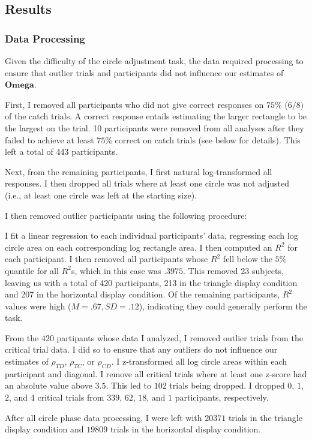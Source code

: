 \subsection{Results}
\subsubsection{Data Processing}
Given the difficulty of the circle adjustment task, the data required processing to ensure that outlier trials and participants did not influence our estimates of $\mathbf{Omega}$.

First, I removed all participants who did not give correct responses on $75\%$ ($6/8)$ of the catch trials. A correct response entails estimating the larger rectangle to be the largest on the trial. 10 participants were removed from all analyses after they failed to achieve at least $75\%$ correct on catch trials (see below for details). This left a total of 443 participants.

Next, from the remaining participants, I first natural log-transformed all responses. I then dropped all trials where at least one circle was not adjusted (i.e., at least one circle was left at the starting size).

I then removed outlier participants using the following procedure:

I fit a linear regression to each individual participants' data, regressing each log circle area on each corresponding log rectangle area. I then computed an $R^2$ for each participant. I then removed all participants whose $R^2$ fell below the $5\%$ quantile for all $R^2$s, which in this case was $.3975$. This removed 23 subjects, leaving us with a total of 420 participants, 213 in the triangle display condition and 207 in the horizontal display condition. Of the remaining participants, $R^2$ values were high ($M=.67,SD=.12$), indicating they could generally perform the task.

From the $420$ partipants whose data I analyzed, I removed outlier trials from the critical trial data. I did so to ensure that any outliers do not influence our estimates of $\rho_{TD}$, $\rho_{TC}$, or $\rho_{CD}$. I z-transformed all log circle areas within each participant and diagonal. I remove all critical trials where at least one z-score had an absolute value above $3.5$. This led to $102$ trials being dropped. I dropped $0$, $1$, $2$, and $4$ critical trials from $339$, $62$, $18$, and $1$ participants, respectively. 

After all circle phase data processing, I were left with $20371$ trials in the triangle display condition and $19809$ trials in the horizontal display condition. 

